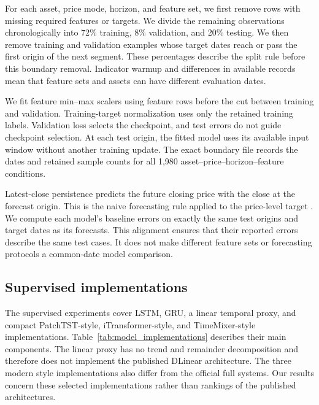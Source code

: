 For each asset, price mode, horizon, and feature set, we first remove rows with missing required features or targets. We divide the remaining observations chronologically into 72\% training, 8\% validation, and 20\% testing. We then remove training and validation examples whose target dates reach or pass the first origin of the next segment. These percentages describe the split rule before this boundary removal. Indicator warmup and differences in available records mean that feature sets and assets can have different evaluation dates.

We fit feature min--max scalers using feature rows before the cut between training and validation. Training-target normalization uses only the retained training labels. Validation loss selects the checkpoint, and test errors do not guide checkpoint selection. At each test origin, the fitted model uses its available input window without another training update. The exact boundary file records the dates and retained sample counts for all 1,980 asset--price--horizon--feature conditions.

Latest-close persistence predicts the future closing price with the close at the forecast origin. This is the naive forecasting rule applied to the price-level target \cite{hyndman2018forecasting}. We compute each model's baseline errors on exactly the same test origins and target dates as its forecasts. This alignment ensures that their reported errors describe the same test cases. It does not make different feature sets or forecasting protocols a common-date model comparison.

\subsection{Supervised implementations}

The supervised experiments cover LSTM, GRU, a linear temporal proxy, and compact PatchTST-style, iTransformer-style, and TimeMixer-style implementations. Table~\ref{tab:model_implementations} describes their main components. The linear proxy has no trend and remainder decomposition and therefore does not implement the published DLinear architecture. The three modern style implementations also differ from the official full systems. Our results concern these selected implementations rather than rankings of the published architectures.

